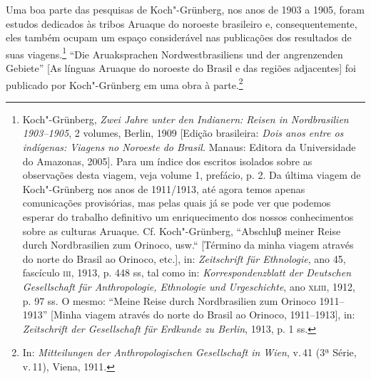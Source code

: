 Uma boa parte das pesquisas de Koch"-Grünberg, nos anos de 1903 a 1905,
foram estudos dedicados às tribos Aruaque do noroeste brasileiro e,
consequentemente, eles também ocupam um espaço considerável nas
publicações dos resultados de suas viagens.\footnote{Koch"-Grünberg,
  \emph{Zwei Jahre unter den Indianern: Reisen in Nordbrasilien
  1903--1905}, 2 volumes, Berlin, 1909 {[}Edição brasileira: \emph{Dois
  anos entre os indígenas: Viagens no Noroeste do Brasil.} Manaus:
  Editora da Universidade do Amazonas, 2005{]}. Para um índice dos
  escritos isolados sobre as observações desta viagem, veja volume 1,
  prefácio, p. 2. Da última viagem de Koch"-Grünberg nos anos de
  1911/1913, até agora temos apenas comunicações provisórias, mas pelas
  quais já se pode ver que podemos esperar do trabalho definitivo um
  enriquecimento dos nossos conhecimentos sobre as culturas Aruaque. Cf.
  Koch"-Grünberg, ``Abschluβ meiner Reise durch Nordbrasilien zum
  Orinoco, usw.`` {[}Término da minha viagem através do norte do Brasil
  ao Orinoco, etc.{]}, in: \emph{Zeitschrift für Ethnologie}, ano 45,
  fascículo \textsc{iii}, 1913, p. 448 ss, tal como in: \emph{Korrespondenzblatt
  der Deutschen Gesellschaft für Anthropologie, Ethnologie und
  Urgeschichte}, ano \textsc{xliii}, 1912, p. 97 ss. O mesmo: ``Meine Reise durch
  Nordbrasilien zum Orinoco 1911--1913'' {[}Minha viagem através do norte
  do Brasil ao Orinoco, 1911--1913{]}, in: \emph{Zeitschrift der
  Gesellschaft für Erdkunde zu Berlin}, 1913, p. 1 ss.} ``Die
Aruaksprachen Nordwestbrasiliens und der angrenzenden Gebiete'' {[}As
línguas Aruaque do noroeste do Brasil e das regiões adjacentes{]} foi
publicado por Koch"-Grünberg em uma obra à parte.\footnote{In:
  \emph{Mitteilungen der Anthropologischen Gesellschaft in Wien}, v.\,41
  (3ª Série, v.\,11), Viena, 1911.}

